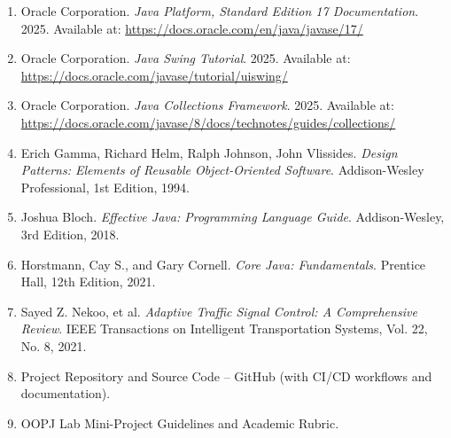 \documentclass[12pt,a4paper]{article}
\begin{document}
\begin{enumerate}
    \item[{[1]}] Oracle Corporation. \textit{Java Platform, Standard Edition 17 Documentation}. 2025.
    Available at: \url{https://docs.oracle.com/en/java/javase/17/}
    
    \item[{[2]}] Oracle Corporation. \textit{Java Swing Tutorial}. 2025.
    Available at: \url{https://docs.oracle.com/javase/tutorial/uiswing/}
    
    \item[{[3]}] Oracle Corporation. \textit{Java Collections Framework}. 2025.
    Available at: \url{https://docs.oracle.com/javase/8/docs/technotes/guides/collections/}
    
    \item[{[4]}] Erich Gamma, Richard Helm, Ralph Johnson, John Vlissides. 
    \textit{Design Patterns: Elements of Reusable Object-Oriented Software}. 
    Addison-Wesley Professional, 1st Edition, 1994.
    
    \item[{[5]}] Joshua Bloch. 
    \textit{Effective Java: Programming Language Guide}. 
    Addison-Wesley, 3rd Edition, 2018.
    
    \item[{[6]}] Horstmann, Cay S., and Gary Cornell. 
    \textit{Core Java: Fundamentals}. 
    Prentice Hall, 12th Edition, 2021.
    
    \item[{[7]}] Sayed Z. Nekoo, et al. 
    \textit{Adaptive Traffic Signal Control: A Comprehensive Review}. 
    IEEE Transactions on Intelligent Transportation Systems, Vol. 22, No. 8, 2021.
    
    \item[{[8]}] Project Repository and Source Code -- GitHub (with CI/CD workflows and documentation).
    
    \item[{[9]}] OOPJ Lab Mini-Project Guidelines and Academic Rubric.
\end{enumerate}
\end{document}
